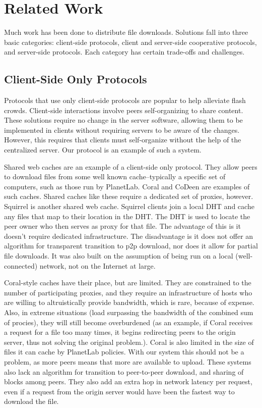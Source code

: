 \section{Related Work}\label{section:related_work}
Much work has been done to distribute file downloads.  Solutions fall into three basic categories: client-side protocols, client and server-side cooperative protocols, and server-side protocols.  Each category has certain trade-offs and challenges.

\subsection{Client-Side Only Protocols}
Protocols that use only client-side protocols are popular to help alleviate flash crowds.  Client-side interactions involve peers self-organizing to share content.  These solutions require no change in the server software, allowing them to be implemented in clients without requiring servers to be aware of the changes.  However, this requires that clients must self-organize without the help of the centralized server.  Our protocol is an example of such a system.

Shared web caches are an example of a client-side only protocol.  They allow peers to download files from some well known cache--typically a specific set of computers, such as those run by PlanetLab.  Coral \cite{coral} and CoDeen \cite{codeen} are examples of such caches.  Shared caches like these require a dedicated set of proxies, however.  Squirrel \cite{squirrel} is another shared web cache.  Squirrel clients join a local DHT and cache any files that map to their location in the DHT.  The DHT is used to locate the peer owner who then serves as proxy for that file.  The advantage of this is it doesn't require dedicated infrastructure.  The disadvantage is it does not offer an algorithm for transparent transition to p2p download, nor does it allow for partial file downloads.  It was also built on the assumption of being run on a local (well-connected) network, not on the Internet at large.

Coral-style caches have their place, but are limited.  They are constrained to the number of participating proxies, and they require an infrastructure of hosts who are willing to altruistically provide bandwidth, which is rare, because of expense.  Also, in extreme situations (load surpassing the bandwidth of the combined sum of procies), they will still become overburdened (as an example, if Coral receives a request for a file too many times, it begins redirecting peers to the origin server, thus not solving the original problem.).  Coral is also limited in the size of files it can cache by PlanetLab policies.  With our system this should not be a problem, as more peers means that more are available to upload.  These systems also lack an algorithm for transition to peer-to-peer download, and sharing of blocks among peers.  They also add an extra hop in network latency per request, even if a request from the origin server would have been the fastest way to download the file.    

